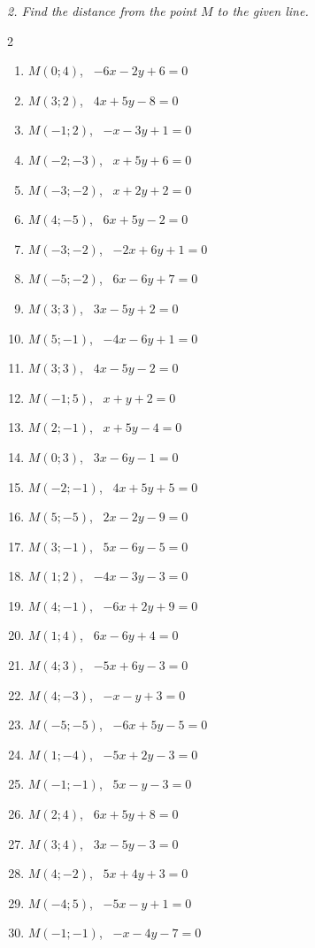 \emph{2. Find the distance from the point $M$ to the given line.}
\bigskip
\begin{multicols}{2}\raggedright
\begin{enumerate}[label=\arabic*., leftmargin=*]
\item $M(0;4)$, \ $-6x-2y+6=0$
\item $M(3;2)$, \ $4x+5y-8=0$
\item $M(-1;2)$, \ $-x-3y+1=0$
\item $M(-2;-3)$, \ $x+5y+6=0$
\item $M(-3;-2)$, \ $x+2y+2=0$
\item $M(4;-5)$, \ $6x+5y-2=0$
\item $M(-3;-2)$, \ $-2x+6y+1=0$
\item $M(-5;-2)$, \ $6x-6y+7=0$
\item $M(3;3)$, \ $3x-5y+2=0$
\item $M(5;-1)$, \ $-4x-6y+1=0$
\item $M(3;3)$, \ $4x-5y-2=0$
\item $M(-1;5)$, \ $x+y+2=0$
\item $M(2;-1)$, \ $x+5y-4=0$
\item $M(0;3)$, \ $3x-6y-1=0$
\item $M(-2;-1)$, \ $4x+5y+5=0$
\item $M(5;-5)$, \ $2x-2y-9=0$
\item $M(3;-1)$, \ $5x-6y-5=0$
\item $M(1;2)$, \ $-4x-3y-3=0$
\item $M(4;-1)$, \ $-6x+2y+9=0$
\item $M(1;4)$, \ $6x-6y+4=0$
\item $M(4;3)$, \ $-5x+6y-3=0$
\item $M(4;-3)$, \ $-x-y+3=0$
\item $M(-5;-5)$, \ $-6x+5y-5=0$
\item $M(1;-4)$, \ $-5x+2y-3=0$
\item $M(-1;-1)$, \ $5x-y-3=0$
\item $M(2;4)$, \ $6x+5y+8=0$
\item $M(3;4)$, \ $3x-5y-3=0$
\item $M(4;-2)$, \ $5x+4y+3=0$
\item $M(-4;5)$, \ $-5x-y+1=0$
\item $M(-1;-1)$, \ $-x-4y-7=0$
\end{enumerate}
\end{multicols}

